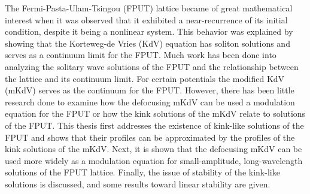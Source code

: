 
The Fermi-Pasta-Ulam-Tsingou (FPUT) lattice became of great mathematical interest when it was observed that it exhibited a near-recurrence of its initial condition, despite it being a nonlinear system. This behavior was explained by showing that the Korteweg-de Vries (KdV) equation has soliton solutions and serves as a continuum limit for the FPUT. Much work has been done into analyzing the solitary wave solutions of the FPUT and the relationship between the lattice and its continuum limit. For certain potentials the modified KdV (mKdV) serves as the continuum for the FPUT. However, there has been little research done to examine how the defocusing mKdV can be used a modulation equation for the FPUT or how the kink solutions of the mKdV relate to solutions of the FPUT. This thesis first addresses the existence of kink-like solutions of the FPUT and shows that their profiles can be approximated by the profiles of the kink solutions of the mKdV. Next, it is shown that the defocusing mKdV can be used more widely as a modulation equation for small-amplitude, long-wavelength solutions of the FPUT lattice. Finally, the issue of stability of the kink-like solutions is discussed, and some results toward linear stability are given.
